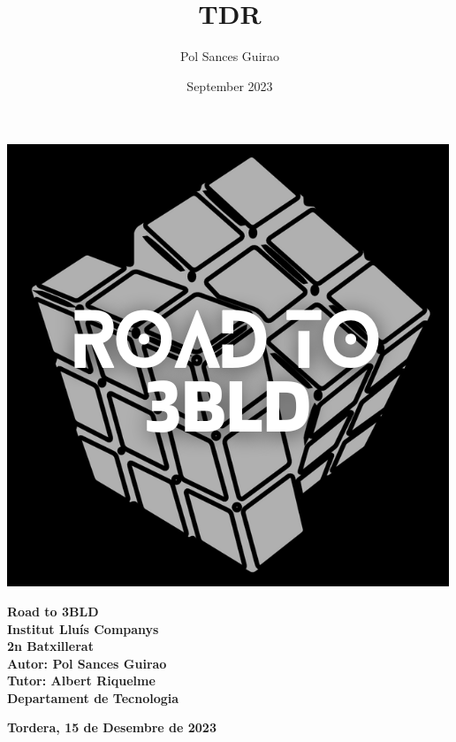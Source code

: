 \documentclass[11pt,oneside]{book}
\title{TDR}
\author{Pol Sances Guirao}
\date{September 2023}
\begin{document}
\frontmatter


\begin{titlepage}
    \centering
    \vspace*{\fill}
    
    \begin{minipage}{0.4\textwidth}
        \includegraphics[width=\textwidth]{img/logos/logo_TdR.png}
    \end{minipage}
    \hfill
    \begin{minipage}{0.5\textwidth}
        \begin{center}
            \textbf{\Huge Road to 3BLD}\\
            \vspace{0.5cm}
            \textbf{\LARGE Institut Lluís Companys}\\
            \vspace{0.5cm}
            \textbf{\Large 2n Batxillerat}\\
            \vspace{0.5cm}
            \textbf{\large Autor: Pol Sances Guirao}\\
            \vspace{0.5cm}
            \textbf{\large Tutor: Albert Riquelme}\\
            \vspace{0.5cm}
            \textbf{\large Departament de Tecnologia}
        \end{center}
    \end{minipage}

    \vfill
    \vspace*{\fill}
    \textbf{Tordera, 15 de Desembre de 2023}
\end{titlepage}
\end{document}
